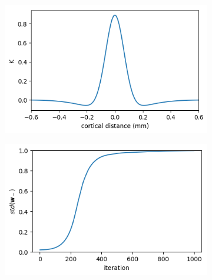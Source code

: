 \documentclass{article}
\begin{document}
\begin{figure}[h]
	\centering
	\begin{subfigure}[t]{0.38\linewidth}
		\centering
		\includegraphics[width = 1.0\linewidth, trim={0 0 0 0}, clip=true]{figures/plot_K.png}
		\label{fig:plotK}	
	\end{subfigure}%
	\hspace{0.1\linewidth}
	\begin{subfigure}[t]{0.38\linewidth}
		\centering
		\includegraphics[width = 1.0\linewidth, trim={0 0 0 0}, clip=true]{figures/occsimtemp_stds.png}
		\label{fig:stds}	
	\end{subfigure}%
\caption{}
\label{}
\end{figure}
\end{document}
